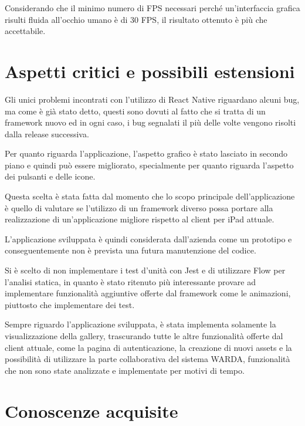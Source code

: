 Considerando che il minimo numero di FPS necessari perché un'interfaccia grafica risulti fluida all'occhio umano è di 30 FPS, il risultato ottenuto è più che accettabile.

\section{Aspetti critici e possibili estensioni}

Gli unici problemi incontrati con l'utilizzo di React Native riguardano alcuni bug, ma come è già stato detto, questi sono dovuti al fatto che si tratta di un framework nuovo ed in ogni caso, i bug segnalati il più delle volte vengono risolti dalla release successiva.

Per quanto riguarda l'applicazione, l'aspetto grafico è stato lasciato in secondo piano e quindi può essere migliorato, specialmente per quanto riguarda l'aspetto dei pulsanti e delle icone.

Questa scelta è stata fatta dal momento che lo scopo principale dell'applicazione è quello di valutare se l'utilizzo di un framework diverso possa portare alla realizzazione di un'applicazione migliore rispetto al client per iPad attuale.

L'applicazione sviluppata è quindi considerata dall'azienda come un prototipo e conseguentemente non è prevista una futura manutenzione del codice. 

Si è scelto di non implementare i test d'unità con Jest e di utilizzare Flow per l'analisi statica, in quanto è stato ritenuto più interessante provare ad implementare funzionalità aggiuntive offerte dal framework come le animazioni, piuttosto che implementare dei test.


Sempre riguardo l'applicazione sviluppata, è stata implementa solamente la visualizzazione della gallery, trascurando tutte le altre funzionalità offerte dal client attuale, come la pagina di autenticazione, la creazione di nuovi assets e la possibilità di utilizzare la parte collaborativa del sistema WARDA, funzionalità che non sono state analizzate e implementate per motivi di tempo.

\section{Conoscenze acquisite}

